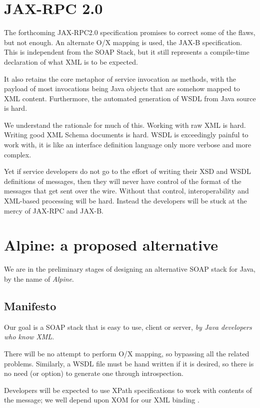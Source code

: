 \documentclass[draft]{article}
\begin{document}
\section{JAX-RPC 2.0}

The forthcoming JAX-RPC2.0 specification promises to correct some of the
flaws, but not enough. An alternate O/X mapping is used, the JAX-B
specification. This is independent from the SOAP Stack, but it still
represents a compile-time declaration of what XML is to be expected.


It also retains the core metaphor of service invocation as methods, with the 
payload of most invocations being Java objects that are somehow mapped to XML content.
Furthermore, the automated generation of WSDL from Java source is hard. 

We understand the rationale for much of this. Working with raw XML is hard. 
Writing good XML Schema documents is hard. WSDL is exceedingly painful to work with,
it is like an interface definition language only more verbose and more complex. 

Yet if service developers do not go to the effort of writing their XSD
and WSDL definitions of messages, then they will never have control of
the format of the messages that get sent over the wire. Without that
control, interoperability and XML-based processing will be hard. Instead
the developers will be stuck at the mercy of JAX-RPC and JAX-B.

\section{Alpine: a proposed alternative}

We are in the preliminary stages of designing an alternative SOAP stack
for Java, by the name of \emph{Alpine}. 

\subsection{Manifesto}

Our goal is a SOAP stack that is easy to use, client or server, 
\emph{by Java developers who know XML}. 


There will be no attempt to perform O/X mapping, so bypassing all the
related problems. Similarly, a WSDL file must be hand written if it is
desired, so there is no need (or option) to generate one through
introspection.

Developers will be expected to use XPath specifications to work with
contents of the message; we well depend upon XOM for our XML binding
\cite{harold:xom}.
\end{document}

